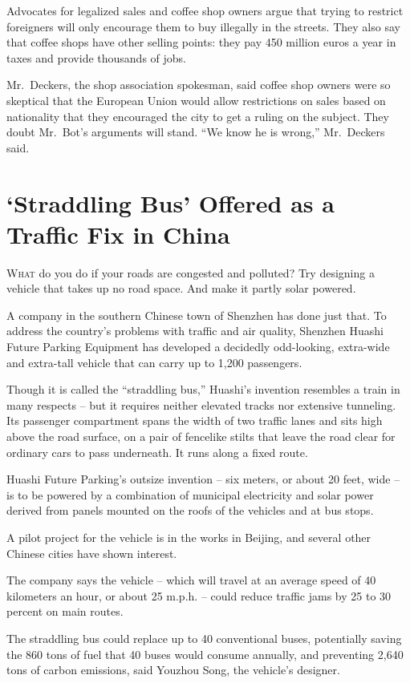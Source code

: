 ﻿\documentclass[12pt]{article}
\begin{document}
Advocates for legalized sales and coffee shop owners argue that trying to restrict foreigners will
only encourage them to buy illegally in the streets. They also say that coffee shops have other
selling points: they pay 450 million euros a year in taxes and provide thousands of jobs.

Mr.~Deckers, the shop association spokesman, said coffee shop owners were so skeptical that the
European Union would allow restrictions on sales based on nationality that they encouraged the city
to get a ruling on the subject. They doubt Mr.~Bot's arguments will stand. ``We know he is wrong,''
Mr.~Deckers said.

\section{`Straddling Bus' Offered as a Traffic Fix in China}

\lettrine{W}{hat} do you do if your roads are congested and polluted? Try
designing a vehicle that takes up no road space. And make it partly solar powered.

A company in the southern Chinese town of Shenzhen has done just that. To address the country's
problems with traffic and air quality, Shenzhen Huashi Future Parking Equipment has developed a
decidedly odd-looking, extra-wide and extra-tall vehicle that can carry up to 1,200 passengers.

Though it is called the ``straddling bus,'' Huashi's invention resembles a train in many respects --
but it requires neither elevated tracks nor extensive tunneling. Its passenger compartment spans the
width of two traffic lanes and sits high above the road surface, on a pair of fencelike stilts that
leave the road clear for ordinary cars to pass underneath. It runs along a fixed route.

Huashi Future Parking's outsize invention -- six meters, or about 20 feet, wide -- is to be powered
by a combination of municipal electricity and solar power derived from panels mounted on the roofs
of the vehicles and at bus stops.

A pilot project for the vehicle is in the works in Beijing, and several other Chinese cities have
shown interest.

The company says the vehicle -- which will travel at an average speed of 40 kilometers an hour, or
about 25 m.p.h. -- could reduce traffic jams by 25 to 30 percent on main routes.

The straddling bus could replace up to 40 conventional buses, potentially saving the 860 tons of
fuel that 40 buses would consume annually, and preventing 2,640 tons of carbon emissions, said
Youzhou Song, the vehicle's designer.
\end{document}
